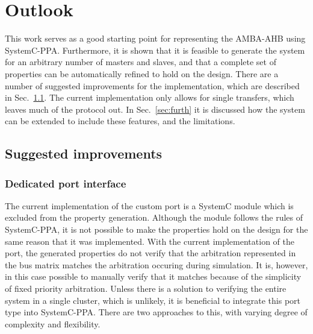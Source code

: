 \section{Outlook}
\label{sec:outl}
This work serves as a good starting point for representing the AMBA-AHB using SystemC-PPA. Furthermore, it is shown that it is feasible to generate the system for an arbitrary number of masters and slaves, and that a complete set of properties can be automatically refined to hold on the design. There are a number of suggested improvements for the implementation, which are described in Sec.~\ref{sec:impr}. The current implementation only allows for single transfers, which leaves much of the protocol out. In Sec.~\ref{sec:furth} it is discussed how the system can be extended to include these features, and the limitations.

\subsection{Suggested improvements}
\label{sec:impr}
\subsubsection{Dedicated port interface}
The current implementation of the custom port is a SystemC module which is excluded from the property generation. Although the module follows the rules of SystemC-PPA, it is not possible to make the properties hold on the design for the same reason that it was implemented. With the current implementation of the port, the generated properties do not verify that the arbitration represented in the bus matrix matches the arbitration occuring during simulation. It is, however, in this case possible to manually verify that it matches because of the simplicity of fixed priority arbitration. Unless there is a solution to verifying the entire system in a single cluster, which is unlikely, it is beneficial to integrate this port type into SystemC-PPA. There are two approaches to this, with varying degree of complexity and flexibility. 

